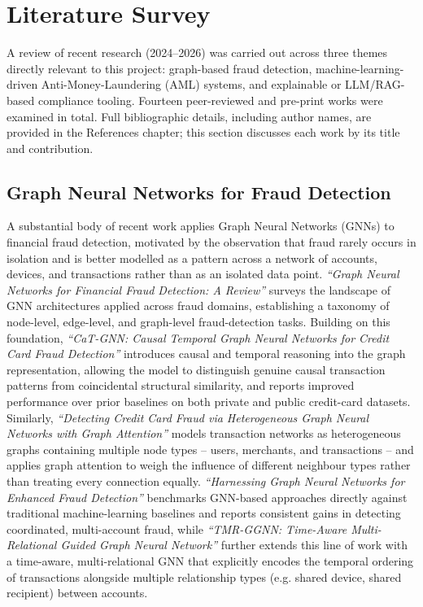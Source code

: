 \chapter{Literature Survey}

A review of recent research (2024--2026) was carried out across three themes directly relevant to this project: graph-based fraud detection, machine-learning-driven Anti-Money-Laundering (AML) systems, and explainable or LLM/RAG-based compliance tooling. Fourteen peer-reviewed and pre-print works were examined in total. Full bibliographic details, including author names, are provided in the References chapter; this section discusses each work by its title and contribution.

\section{Graph Neural Networks for Fraud Detection}

A substantial body of recent work applies Graph Neural Networks (GNNs) to financial fraud detection, motivated by the observation that fraud rarely occurs in isolation and is better modelled as a pattern across a network of accounts, devices, and transactions rather than as an isolated data point. \textit{``Graph Neural Networks for Financial Fraud Detection: A Review''} \cite{gnn_review2024} surveys the landscape of GNN architectures applied across fraud domains, establishing a taxonomy of node-level, edge-level, and graph-level fraud-detection tasks. Building on this foundation, \textit{``CaT-GNN: Causal Temporal Graph Neural Networks for Credit Card Fraud Detection''} \cite{catgnn2024} introduces causal and temporal reasoning into the graph representation, allowing the model to distinguish genuine causal transaction patterns from coincidental structural similarity, and reports improved performance over prior baselines on both private and public credit-card datasets. Similarly, \textit{``Detecting Credit Card Fraud via Heterogeneous Graph Neural Networks with Graph Attention''} \cite{hgnn2025} models transaction networks as heterogeneous graphs containing multiple node types -- users, merchants, and transactions -- and applies graph attention to weigh the influence of different neighbour types rather than treating every connection equally. \textit{``Harnessing Graph Neural Networks for Enhanced Fraud Detection''} \cite{gnn_enhance2025} benchmarks GNN-based approaches directly against traditional machine-learning baselines and reports consistent gains in detecting coordinated, multi-account fraud, while \textit{``TMR-GGNN: Time-Aware Multi-Relational Guided Graph Neural Network''} \cite{tmrggnn2026} further extends this line of work with a time-aware, multi-relational GNN that explicitly encodes the temporal ordering of transactions alongside multiple relationship types (e.g. shared device, shared recipient) between accounts.

